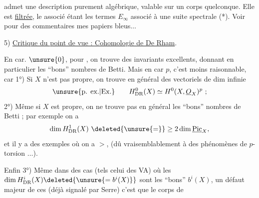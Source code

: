 admet une description purement algébrique, valable  sur un corps  quelconque.
Elle est \uline{filtrée}, le  associé étant les termes $E_\infty$ associé à une suite spectrale (*). Voir pour des commentaires mes papiers bleus$\ldots$

5) \uline{Critique du point de vue : Cohomologie de De Rham}.



 En car. $\unsure{0}$, pour , on trouve des invariants excellents, donnant en particulier les ``bons'' nombres de Betti.
Mais en car $p$, c'est moins raisonnable, car
1°) Si $X$ n'est pas propre, on trouve en général des vectoriels de dim infinie
\[
\unsure{\text{p. ex.}|\text{Ex.}}\qquad H_{\mathrm{DR}}^0(X)\simeq H^0(X,\underline O_X)^p\ ;
\]
2°) Même si $X$ est propre, on ne trouve pas en général les ``bons'' nombres de Betti ; par exemple on a
\[
\dim H_{\mathrm{DR}}^1(X)\ \deleted{\unsure{=}}\geq 2\dim\underline{\mathrm{Pic}}_X,
\]
et il y a des exemples où on a $>$, (dû vraisemblablement à des phénomènes de $p$-torsion $\ldots$).

Enfin 3°) Même dans des cas (tels celui des VA) où les $\dim H_{\mathrm{DR}}^i(X)\deleted{\unsure{=b^i(X)}}$ sont les ``bons'' $b^i(X)$, un défaut majeur de ces  (déjà signalé par Serre) c'est que le corps de
